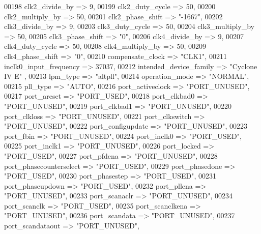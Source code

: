 \begin{DoxyCode}
{00198         clk2\_divide\_by => \textcolor{vhdllogic}{9},
00199         clk2\_duty\_cycle => \textcolor{vhdllogic}{50},
00200         clk2\_multiply\_by => \textcolor{vhdllogic}{50},
00201         clk2\_phase\_shift => "-1667",
00202         clk3\_divide\_by => \textcolor{vhdllogic}{9},
00203         clk3\_duty\_cycle => \textcolor{vhdllogic}{50},
00204         clk3\_multiply\_by => \textcolor{vhdllogic}{50},
00205         clk3\_phase\_shift => "\textcolor{vhdllogic}{0}",
00206         clk4\_divide\_by => \textcolor{vhdllogic}{9},
00207         clk4\_duty\_cycle => \textcolor{vhdllogic}{50},
00208         clk4\_multiply\_by => \textcolor{vhdllogic}{50},
00209         clk4\_phase\_shift => "\textcolor{vhdllogic}{0}",
00210         compensate\_clock => \textcolor{keyword}{"CLK1"},
00211         inclk0\_input\_frequency => \textcolor{vhdllogic}{37037},
00212         intended\_device\_family => \textcolor{keyword}{"Cyclone IV E"}  ,
00213         lpm\_type => \textcolor{keyword}{"altpll"},
00214         operation\_mode => \textcolor{keyword}{"NORMAL"},
00215         pll\_type => \textcolor{keyword}{"AUTO"},
00216         port\_activeclock => \textcolor{keyword}{"PORT\_UNUSED"},
00217         port\_areset => \textcolor{keyword}{"PORT\_USED"},
00218         port\_clkbad0 => \textcolor{keyword}{"PORT\_UNUSED"},
00219         port\_clkbad1 => \textcolor{keyword}{"PORT\_UNUSED"},
00220         port\_clkloss => \textcolor{keyword}{"PORT\_UNUSED"},
00221         port\_clkswitch => \textcolor{keyword}{"PORT\_UNUSED"},
00222         port\_configupdate => \textcolor{keyword}{"PORT\_UNUSED"},
00223         port\_fbin => \textcolor{keyword}{"PORT\_UNUSED"},
00224         port\_inclk0 => \textcolor{keyword}{"PORT\_USED"},
00225         port\_inclk1 => \textcolor{keyword}{"PORT\_UNUSED"},
00226         port\_locked => \textcolor{keyword}{"PORT\_USED"},
00227         port\_pfdena => \textcolor{keyword}{"PORT\_UNUSED"},
00228         port\_phasecounterselect => \textcolor{keyword}{"PORT\_USED"},
00229         port\_phasedone => \textcolor{keyword}{"PORT\_USED"},
00230         port\_phasestep => \textcolor{keyword}{"PORT\_USED"},
00231         port\_phaseupdown => \textcolor{keyword}{"PORT\_USED"},
00232         port\_pllena => \textcolor{keyword}{"PORT\_UNUSED"},
00233         port\_scanaclr => \textcolor{keyword}{"PORT\_UNUSED"},
00234         port\_scanclk => \textcolor{keyword}{"PORT\_USED"},
00235         port\_scanclkena => \textcolor{keyword}{"PORT\_UNUSED"},
00236         port\_scandata => \textcolor{keyword}{"PORT\_UNUSED"},
00237         port\_scandataout => \textcolor{keyword}{"PORT\_UNUSED"},
}
\end{DoxyCode}
